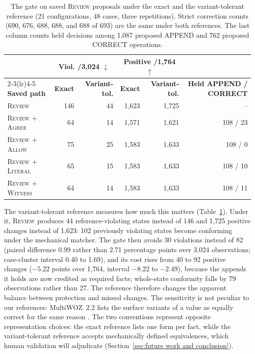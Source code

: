 \documentclass[acmsmall,review,anonymous]{acmart}
\newcommand{\agree}{\textsc{Agree}}
\newcommand{\allow}{\textsc{Allow}}
\newcommand{\literal}{\textsc{Literal}}
\newcommand{\witness}{\textsc{Witness}}
\newcommand{\review}{\textsc{Review}}
\begin{document}
\begin{table}[tbp]
\centering
\caption{The gate on saved \review{} proposals under the exact and the variant-tolerant reference (21 configurations, 48 cases, three repetitions). Strict correction counts (690, 676, 688, 688, and 688 of 693) are the same under both references. The last column counts held decisions among 1,087 proposed APPEND and 762 proposed CORRECT operations.}\label{tab:10}
\small
\setlength{\tabcolsep}{3pt}
\begin{tabular}{@{}lrrrrr@{}}
\toprule
 & \multicolumn{2}{c}{\textbf{Viol. /3,024 $\downarrow$}} & \multicolumn{2}{c}{\textbf{Positive /1,764 $\uparrow$}} & \\
\cmidrule(lr){2-3}\cmidrule(lr){4-5}
\textbf{Saved path} & \textbf{Exact} & \textbf{Variant-tol.} & \textbf{Exact} & \textbf{Variant-tol.} & \textbf{Held APPEND / CORRECT} \\
\midrule
\review{} & 146 & 44 & 1,623 & 1,725 & -- \\
\review{} + \agree{} & 64 & 14 & 1,571 & 1,621 & 108 / 23 \\
\review{} + \allow{} & 75 & 25 & 1,583 & 1,633 & 108 / 0 \\
\review{} + \literal{} & 65 & 15 & 1,583 & 1,633 & 108 / 10 \\
\review{} + \witness{} & 64 & 14 & 1,583 & 1,633 & 108 / 11 \\
\bottomrule
\end{tabular}
\end{table}

The variant-tolerant reference measures how much this matters (Table~\ref{tab:10}). Under it, \review{} produces 44 reference-violating states instead of 146 and 1,725 positive changes instead of 1,623: 102 previously violating states become conforming under the mechanical matcher. The gate then avoids 30 violations instead of 82 (paired difference 0.99 rather than 2.71 percentage points over 3,024 observations; case-cluster interval 0.40 to 1.69), and its cost rises from 40 to 92 positive changes ($-5.22$ points over 1,764, interval $-8.22$ to $-2.49$), because the appends it holds are now credited as required facts; whole-state conformity falls by 79 observations rather than 27. The reference therefore changes the apparent balance between protection and missed changes. The sensitivity is not peculiar to our references: MultiWOZ~2.2 lists the surface variants of a value as equally correct for the same reason \cite{cite44}. The two conventions represent opposite representation choices: the exact reference lists one form per fact, while the variant-tolerant reference accepts mechanically defined equivalences, which human validation will adjudicate (Section~\ref{sec:future work and conclusion}).
\end{document}
